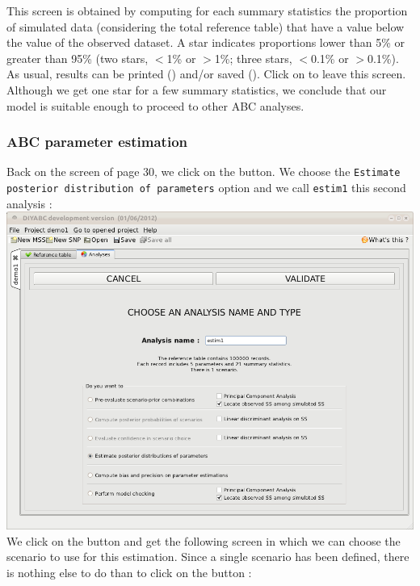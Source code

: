 This screen is obtained by computing for each summary statistics the proportion of simulated data (considering the total reference table) that have a value below the value of the observed dataset. A star indicates proportions lower than 5\% or greater than 95\% (two stars, $<$1\% or $>$1\%; three stars, $<$0.1\% or $>$0.1\%).\\ 

 As usual, results can be printed () and/or saved (). Click on  to leave this screen.\\

Although we get one star for a few summary statistics, we conclude that our model is suitable enough to proceed to other ABC analyses.

\subsubsection{ABC parameter estimation}

Back on the screen of page 30, we click on the  button. We choose the \texttt{Estimate posterior distribution of parameters} option and we call \texttt{estim1} this second analysis :\\

\includegraphics[scale=0.35]{gui_pictures/Capture-DIYABC-34.png} \\
 
We click on the  button and get the following screen in which we can choose the scenario to use for this estimation. Since a single scenario has been defined, there is nothing else to do than to click on the  button : \\

